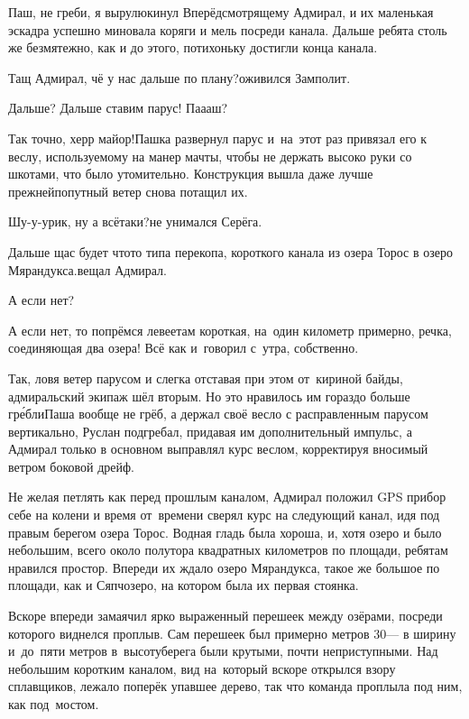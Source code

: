 \diagdash Паш, не греби, я вырулю\mdash кинул Вперёдсмотрящему Адмирал, и их маленькая эскадра успешно миновала коряги и мель посреди канала. Дальше ребята столь же безмятежно, как и до этого, потихоньку достигли конца канала.

\diagdash Тащ Адмирал, чё у нас дальше по плану?\mdash оживился Замполит.

\diagdash Дальше? Дальше ставим парус! Па\sdash а\sdash аш?

\diagdash Так точно, херр майор!\mdash Пашка развернул парус и~на~этот раз привязал его к веслу, используемому на манер мачты, чтобы не держать высоко руки со шкотами, что было утомительно. Конструкция вышла даже лучше прежней\mdash попутный ветер снова потащил их. 

\diagdash Шу-у-урик, ну а всё\sdash таки?\mdash не унимался Серёга.

\diagdash Дальше щас будет что\sdash то типа перекопа, короткого канала из озера Торос в озеро Мярандукса.\mdash вещал Адмирал.

\diagdash А если нет?

\diagdash А если нет, то попрёмся левее\mdash там короткая, на~один километр примерно, речка, соединяющая два озера! Всё как и~говорил с~утра, собственно.

Так, ловя ветер парусом и слегка отставая при этом от~кириной байды, адмиральский экипаж шёл вторым. Но это нравилось им гораздо больше гр{\'е}бли\mdash Паша вообще не грёб, а держал своё весло с расправленным парусом вертикально, Руслан подгребал, придавая им дополнительный импульс, а Адмирал только в основном выправлял курс веслом, корректируя вносимый ветром боковой дрейф.

Не желая петлять как перед прошлым каналом, Адмирал положил GPS прибор себе на колени и время от~времени сверял курс на следующий канал, идя под правым берегом озера Торос. Водная гладь была хороша, и, хотя озеро и было небольшим, всего около полутора квадратных километров по площади, ребятам нравился простор. Впереди их ждало озеро Мярандукса, такое же большое по площади, как и Сяпчозеро, на котором была их первая стоянка. 

Вскоре впереди замаячил ярко выраженный перешеек между озёрами, посреди которого виднелся проплыв. Сам перешеек был примерно метров 30\thinspace\nobreakdash--- в ширину и~до~пяти метров в~высоту\mdash берега были крутыми, почти неприступными. Над небольшим коротким каналом, вид на~который вскоре открылся взору сплавщиков, лежало поперёк упавшее дерево, так что команда проплыла под ним, как под~мостом.

